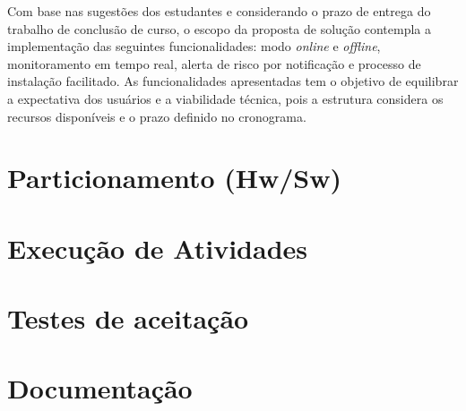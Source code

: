 Com base nas sugestões dos estudantes e considerando o prazo de entrega do trabalho de conclusão de curso, o escopo da proposta de solução contempla a 
implementação das seguintes funcionalidades: modo \textit{online} e \textit{offline}, monitoramento em tempo real, alerta de risco por notificação e processo de instalação facilitado.
As funcionalidades apresentadas tem o objetivo de equilibrar a expectativa dos usuários e a viabilidade técnica, pois a estrutura considera os recursos disponíveis e o prazo definido no 
cronograma.

\section{Particionamento (Hw/Sw)}\label{fase3}

\section{Execução de Atividades}\label{fase4}

\section{Testes de aceitação}\label{fase5}

\section{Documentação}\label{fase6}